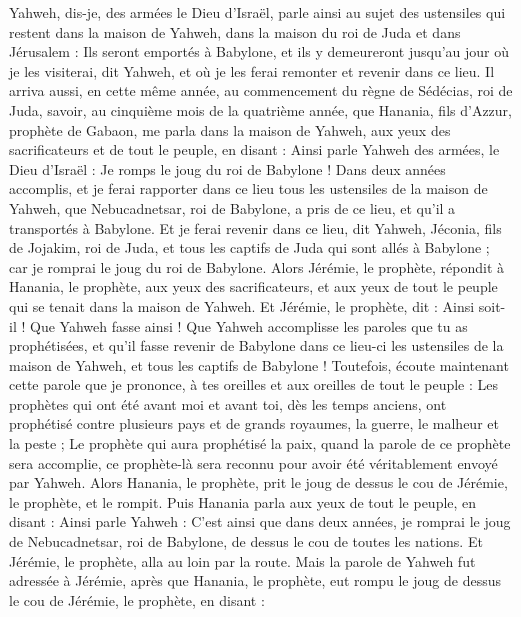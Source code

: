 \begin{multicols}{2}
Yahweh, dis-je, des armées le Dieu d'Israël, parle ainsi au sujet des ustensiles qui restent dans la maison de Yahweh, dans la maison du roi de Juda et dans Jérusalem :
Ils seront emportés à Babylone, et ils y demeureront jusqu'au jour où je les visiterai, dit Yahweh, et où je les ferai remonter et revenir dans ce lieu.
\VerseOne{}Il arriva aussi, en cette même année, au commencement du règne de Sédécias, roi de Juda, savoir, au cinquième mois de la quatrième année, que Hanania, fils d'Azzur, prophète de Gabaon, me parla dans la maison de Yahweh, aux yeux des sacrificateurs et de tout le peuple, en disant :
Ainsi parle Yahweh des armées, le Dieu d'Israël : Je romps le joug du roi de Babylone !
Dans deux années accomplis, et je ferai rapporter dans ce lieu tous les ustensiles de la maison de Yahweh, que Nebucadnetsar, roi de Babylone, a pris de ce lieu, et qu'il a transportés à Babylone.
Et je ferai revenir dans ce lieu, dit Yahweh, Jéconia, fils de Jojakim, roi de Juda, et tous les captifs de Juda qui sont allés à Babylone ; car je romprai le joug du roi de Babylone.
Alors Jérémie, le prophète, répondit à Hanania, le prophète, aux yeux des sacrificateurs, et aux yeux de tout le peuple qui se tenait dans la maison de Yahweh.
Et Jérémie, le prophète, dit : Ainsi soit-il ! Que Yahweh fasse ainsi ! Que Yahweh accomplisse les paroles que tu as prophétisées, et qu'il fasse revenir de Babylone dans ce lieu-ci les ustensiles de la maison de Yahweh, et tous les captifs de Babylone !
Toutefois, écoute maintenant cette parole que je prononce, à tes oreilles et aux oreilles de tout le peuple :
Les prophètes qui ont été avant moi et avant toi, dès les temps anciens, ont prophétisé contre plusieurs pays et de grands royaumes, la guerre, le malheur et la peste ;
Le prophète qui aura prophétisé la paix, quand la parole de ce prophète sera accomplie, ce prophète-là sera reconnu pour avoir été véritablement envoyé par Yahweh.
Alors Hanania, le prophète, prit le joug de dessus le cou de Jérémie, le prophète, et le rompit.
Puis Hanania parla aux yeux de tout le peuple, en disant : Ainsi parle Yahweh : C'est ainsi que dans deux années, je romprai le joug de Nebucadnetsar, roi de Babylone, de dessus le cou de toutes les nations. Et Jérémie, le prophète, alla au loin par la route.
Mais la parole de Yahweh fut adressée à Jérémie, après que Hanania, le prophète, eut rompu le joug de dessus le cou de Jérémie, le prophète, en disant :

\end{multicols}
